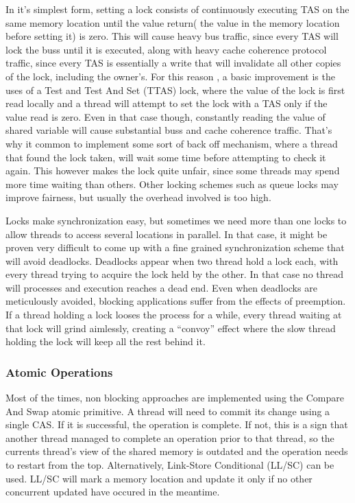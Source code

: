 In it's simplest form, setting a lock consists of  continuously executing TAS on the same memory location until the value return( the value in the memory location before setting it) is zero. This will cause heavy bus traffic, since every TAS will lock the buss until it is executed, along with heavy cache coherence protocol traffic, since every TAS is essentially a write that will invalidate all other copies of the lock, including the owner's. For this reason , a basic improvement is the uses of a Test and Test And Set (TTAS) lock, where the value of the lock is first read locally and a thread will attempt to set the lock with a TAS only if the value read is zero. Even in that case though, constantly reading the value of shared variable will cause substantial buss and cache coherence traffic. That's why it common to implement some sort of back off mechanism, where a thread that found the lock taken, will wait some time before attempting to check it again. This however makes the lock quite unfair, since some threads may spend more time waiting than others. Other locking schemes such as queue locks may improve fairness, but usually the overhead involved is too high.

Locks make synchronization easy, but sometimes we need more than one locks to allow threads to access several locations in parallel. In that case, it might be proven very difficult to come up with a fine grained synchronization scheme that will avoid deadlocks. Deadlocks appear when two thread hold a lock each, with every thread trying to acquire the lock held by the other. In that case no thread will processes and execution reaches a dead end. Even when deadlocks are meticulously avoided, blocking applications suffer from  the effects of preemption. If a thread holding a lock looses the process for a while, every thread waiting at that lock will grind aimlessly, creating a “convoy” effect where the slow thread holding the lock will keep all the rest behind it.

\subsubsection{Atomic Operations}

Most of the times, non blocking approaches are implemented using the Compare And Swap atomic primitive. A thread will need to commit its change using a single CAS. If it is successful, the operation is complete. If not, this is a sign that another thread managed to complete an operation prior to that thread, so the currents thread's view of the shared memory is outdated and the operation needs to restart from the top. Alternatively, Link-Store Conditional (LL/SC) can be used. LL/SC will mark a memory location and update it only if no other concurrent updated have occured in the meantime.

